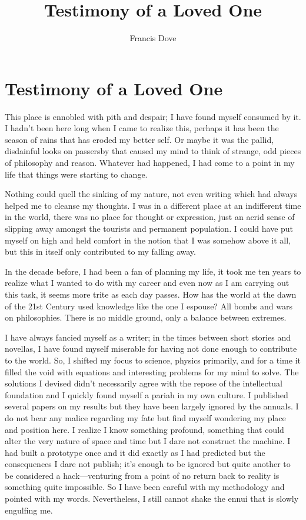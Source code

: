\documentclass[
]{article}
\title{Testimony of a Loved One}
\author{Francis Dove}
\date{}
\begin{document}
\maketitle

\section{Testimony of a Loved One}\label{testimony-of-a-loved-one}

This place is ennobled with pith and despair; I have found myself
consumed by it. I hadn't been here long when I came to realize this,
perhaps it has been the season of rains that has eroded my better self.
Or maybe it was the pallid, disdainful looks on passersby that caused my
mind to think of strange, odd pieces of philosophy and reason. Whatever
had happened, I had come to a point in my life that things were starting
to change.

Nothing could quell the sinking of my nature, not even writing which had
always helped me to cleanse my thoughts. I was in a different place at
an indifferent time in the world, there was no place for thought or
expression, just an acrid sense of slipping away amongst the tourists
and permanent population. I could have put myself on high and held
comfort in the notion that I was somehow above it all, but this in
itself only contributed to my falling away.

In the decade before, I had been a fan of planning my life, it took me
ten years to realize what I wanted to do with my career and even now as
I am carrying out this task, it seems more trite as each day passes. How
has the world at the dawn of the 21st Century used knowledge like the
one I espouse? All bombs and wars on philosophies. There is no middle
ground, only a balance between extremes.

I have always fancied myself as a writer; in the times between short
stories and novellas, I have found myself miserable for having not done
enough to contribute to the world. So, I shifted my focus to science,
physics primarily, and for a time it filled the void with equations and
interesting problems for my mind to solve. The solutions I devised
didn't necessarily agree with the repose of the intellectual foundation
and I quickly found myself a pariah in my own culture. I published
several papers on my results but they have been largely ignored by the
annuals. I do not bear any malice regarding my fate but find myself
wondering my place and position here. I realize I know something
profound, something that could alter the very nature of space and time
but I dare not construct the machine. I had built a prototype once and
it did exactly as I had predicted but the consequences I dare not
publish; it's enough to be ignored but quite another to be considered a
hack---venturing from a point of no return back to reality is something
quite impossible. So I have been careful with my methodology and pointed
with my words. Nevertheless, I still cannot shake the ennui that is
slowly engulfing me.
\end{document}
